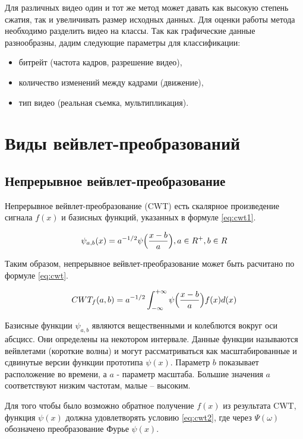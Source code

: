 Для различных видео один и тот же метод может давать как высокую степень сжатия, так и 
увеличивать размер исходных данных. Для оценки работы метода необходимо разделить видео на классы. Так как 
графические данные разнообразны, дадим следующие параметры для классификации:

\begin{itemize}
\item битрейт (частота кадров, разрешение видео),
\item количество изменений между кадрами (движение),
\item тип видео (реальная съемка, мультипликация).
\end{itemize}

\section{Виды вейвлет-преобразований}
\subsection{Непрерывное вейвлет-преобразование}
Непрерывное вейвлет-преобразование (CWT) есть скалярное произведение сигнала $f(x)$ и базисных функций, указанных в формуле \ref{eq:cwt1}.

\begin{equation}\label{eq:cwt1}
\psi_{a,b}(x)=a^{-1/2}\psi\Bigl(\frac{x-b}{a}\Bigr), a \in R^{+}, b \in R
\end{equation}

Таким образом, непрерывное вейвлет-преобразование может быть расчитано по формуле \ref{eq:cwt}.

\begin{equation}\label{eq:cwt}
CWT_{f}(a,b)=a^{-1/2}\int_{-\infty}^{+\infty}\psi\Bigl(\frac{x-b}{a}\Bigr)f(x)d(x)
\end{equation}

Базисные функции $\psi_{a,b}$ являются вещественными и колеблются вокруг оси абсцисс. 
Они определены на некотором интервале. Данные функции называются вейвлетами
(короткие волны) и могут рассматриваться как масштабированные и сдвинутые версии функции прототипа $\psi(x)$. 
Параметр $b$ показывает расположение во времени, а $a$ - параметр масштаба. Большие значения $a$ соответствуют низким частотам, малые – высоким.

Для того чтобы было возможно обратное получение $f(x)$ из результата CWT, функция $\psi(x)$ должна 
удовлетворять условию \ref{eq:cwt2}, где через $\Psi(\omega)$ обозначено преобразование Фурье $\psi(x)$.

